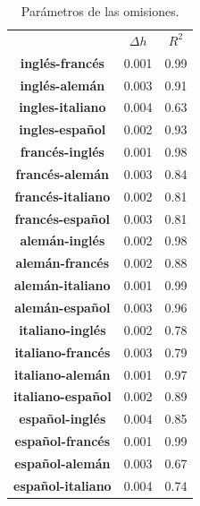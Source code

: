 \begin{table}[h!]
	\centering
	\begin{tabular}{ccc}
		\textbf{}  & \textbf{$\Delta h$}  & \textbf{$R^{2}$}      \\
		\textbf{inglés-francés}    & 0.001           & 0.99       \\
		\textbf{inglés-alemán}     & 0.003           & 0.91       \\
		\textbf{ingles-italiano}   & 0.004           & 0.63       \\
		\textbf{ingles-español}    & 0.002           & 0.93       \\
		\textbf{francés-inglés}    & 0.001           & 0.98       \\    
		\textbf{francés-alemán}    & 0.003           & 0.84       \\ 
		\textbf{francés-italiano}  & 0.002           & 0.81       \\ 
		\textbf{francés-español}   & 0.003           & 0.81       \\ 
		\textbf{alemán-inglés}     & 0.002           & 0.98       \\
		\textbf{alemán-francés}    & 0.002           & 0.88       \\
		\textbf{alemán-italiano}   & 0.001           & 0.99       \\
		\textbf{alemán-español}    & 0.003           & 0.96       \\
		\textbf{italiano-inglés}   & 0.002           & 0.78       \\
		\textbf{italiano-francés}  & 0.003           & 0.79       \\
		\textbf{italiano-alemán}   & 0.001           & 0.97       \\
		\textbf{italiano-español}  & 0.002           & 0.89       \\
		\textbf{español-inglés}    & 0.004           & 0.85       \\
		\textbf{español-francés}   & 0.001           & 0.99       \\
		\textbf{español-alemán}    & 0.003           & 0.67       \\
		\textbf{español-italiano}  & 0.004           & 0.74       
	\end{tabular}
	\caption{Parámetros de las omisiones.}
	\label{tab.Omision}
\end{table}



